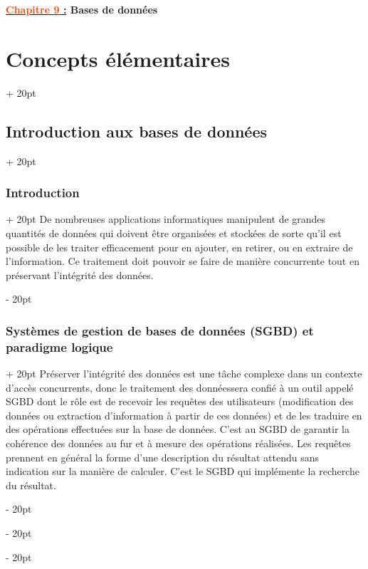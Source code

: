 \documentclass[a4paper, 12pt, twoside]{article}
\author{Lasercata}
\date{\today}
\renewcommand{\emph}{\textcolor{ff4500}}
\newcommand{\ind}[1][20pt]{\advance\leftskip + #1}
\newcommand{\deind}[1][20pt]{\advance\leftskip - #1}
\newenvironment{indt}[2][20pt]{#2 \par \ind[#1]}{\par \deind} %
\newcommand{\thetitle}[2]{\begin{center}\textbf{{\LARGE \underline{\emph{#1} :}} {\Large #2}}\end{center}}
\begin{document}
    
    
    \thetitle{Chapitre 9}{Bases de données}
    
    \tableofcontents
    \newpage
    
    
    \begin{indt}{\section{Concepts élémentaires}}
        
        \begin{indt}{\subsection{Introduction aux bases de données}}
            \begin{indt}{\subsubsection{Introduction}}
                De nombreuses applications informatiques manipulent de grandes quantités de données qui doivent être organisées et stockées de sorte qu'il est possible de les traiter efficacement pour en ajouter, en retirer, ou en extraire de l'information. Ce traitement doit pouvoir se faire de manière concurrente tout en préservant l'intégrité des données.
            \end{indt}
            
            \vspace{12pt}
            
            \begin{indt}{\subsubsection{Systèmes de gestion de bases de données (SGBD) et paradigme logique}}
                Préserver l'intégrité des données est une tâche complexe dans un contexte d'accès concurrents, donc le traitement des donnéessera confié à un outil appelé SGBD dont le rôle est de recevoir les requêtes des utilisateurs (modification des données ou extraction d'information à partir de ces données) et de les traduire en des opérations effectuées sur la base de données. C'est au SGBD de garantir la cohérence des données au fur et à mesure des opérations réalisées. Les requêtes prennent en général la forme d'une description du résultat attendu sans indication sur la manière de calculer. C'est le SGBD qui implémente la recherche du résultat.
                

\end{indt}
\end{indt}
\end{indt}
\end{document}
